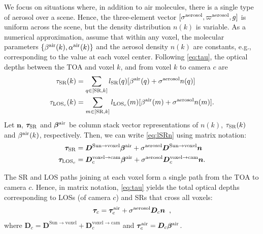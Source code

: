 \documentclass[10pt,letterpaper]{article}
\newcommand{\vect}[1]{\bm{#1}}
\newcommand{\OpDistance}{\bm{D}}
\newcommand{\DistUnknown}{\vect{n}}
\begin{document}
We focus on situations where, in addition to air molecules, there is a
single type of aerosol over a scene. Hence, the three-element vector
$[{\sigma}^{\rm aerosol},\varpi^{\rm aerosol},g]$ is uniform across
the scene, but the density distribution $n(k)$ is
variable. As a numerical approximation, assume that within any voxel,
the molecular parameters $\{ \beta^{\rm air}(k),\alpha^{\rm air}(k)\}$
and the aerosol density $n(k)$ are constants, e.g., corresponding to
the value at each voxel center.  Following \cref{eq:tau}, the optical
depths between the TOA and voxel $k$, and from voxel $k$ to camera $c$
are
\begin{align}
  \tau_{\rm SR}(k)&= \sum_{q \in[{\rm SR},k]} l_{\rm SR}(q)
  [\beta^{\rm air}(q)+\sigma^{\rm aerosol} n(q)] \nonumber \\
  \tau_{{\rm LOS}_c}(k)&= \sum_{m \in[{\rm SR},k]} l_{{\rm LOS}_c}(m)
  [\beta^{\rm air}(m)+\sigma^{\rm aerosol} n(m)].
  \label{eq:lSRn}
\end{align}
Let ${\DistUnknown}$, $\vect{\tau}_{\rm SR}$ and $\vect{\beta}^{\rm air}$ be column
stack vector representations of $n(k)$, $\tau_{\rm SR}(k)$ and $\beta^{\rm
  air}(k)$, respectively.  Then, we can write \cref{eq:lSRn} using
matrix notation: 
\begin{align}
  \vect{\tau}_{\rm SR} &= \OpDistance^{\mathrm{Sun
      \rightarrow voxel}}\vect{\beta}^{\rm air} + \sigma^{\rm
    aerosol}\OpDistance^{\mathrm{Sun \rightarrow voxel}}
  {\DistUnknown} \nonumber \\
  \vect{\tau}_{{\rm LOS}_c} &=
  \OpDistance_c^{\mathrm{voxel \rightarrow cam}}\vect{\beta}^{\rm air} +
  \sigma^{\rm aerosol}\OpDistance_c^{\mathrm{voxel \rightarrow cam}}
  {\DistUnknown}.
\end{align}

The SR and LOS paths joining at each voxel form a
single path from the TOA to camera $c$.  Hence, in matrix notation,
\cref{eq:tau} yields the total optical depths corresponding to LOSs
(of camera $c$) and SRs that cross all voxels:
\begin{equation}
  \vect{\tau}_c= \vect{\tau}_c^{\rm air}
  + \sigma^{\rm aerosol} {\bm D}_c {\bm n}
  \;\;,
  \label{eq:tautotal}
\end{equation}
where ${\bm D}_c= {\bm D}^{\mathrm{Sun \rightarrow voxel}}+ {\bm
  D}^{\mathrm{voxel \rightarrow cam}}_c$ and $\vect{\tau}_c^{\rm air}=
{\bm D}_c \vect{\beta}^{\rm air}$.
  
\end{document}
